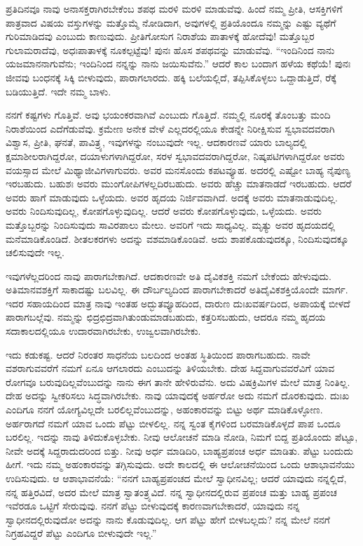 ಪ್ರತಿದಿನವೂ ನಾವು ಅನಾಸಕ್ತರಾಗಿರಬೇಕೆಂಬ ಶಪಥ ಮರಳಿ ಮರಳಿ ಮಾಡುವೆವು. ಹಿಂದೆ ನಮ್ಮ ಪ್ರೀತಿ, ಆಸಕ್ತಿಗಳಿಗೆ ಪಾತ್ರವಾದ ವಿಷಯ ವಸ್ತುಗಳನ್ನು ಮತ್ತೊಮ್ಮೆ ನೋಡಿದಾಗ, ಅವುಗಳಲ್ಲಿ ಪ್ರತಿಯೊಂದೂ ನಮ್ಮನ್ನು ಎಷ್ಟು ವ್ಯಥೆಗೆ ಗುರಿಮಾಡಿದವು ಎಂಬುದು ಕಾಣುವುದು. ಪ್ರೀತಿಗೋಸುಗ ನಿರಾಶೆಯ ಪಾತಾಳಕ್ಕೆ ಹೋದೆವು! ಮತ್ತೊಬ್ಬರ ಗುಲಾಮರಾದೆವು, ಅಧಃಪಾತಾಳಕ್ಕೆ ನೂಕಲ್ಪಟ್ಟೆವು! ಪುನಃ ಹೊಸ ಶಪಥವನ್ನು ಮಾಡುವೆವು. “ಇಂದಿನಿಂದ ನಾನು ಯಜಮಾನನಾಗುವೆನು; ಇಂದಿನಿಂದ ನನ್ನನ್ನು ನಾನು ಜಯಿಸುವೆನು.'' ಆದರೆ ಕಾಲ ಬಂದಾಗ ಹಳೆಯ ಕಥೆಯೆ! ಪುನಃ ಜೀವವು ಬಂಧನಕ್ಕೆ ಸಿಕ್ಕಿ ಬೀಳುವುದು, ಪಾರಾಗಲಾರದು. ಹಕ್ಕಿ ಬಲೆಯಲ್ಲಿದೆ, ತಪ್ಪಿಸಿಕೊಳ್ಳಲು ಒದ್ದಾಡುತ್ತಿದೆ, ರೆಕ್ಕೆ ಬಡಿಯುತ್ತಿದೆ. ಇದೇ ನಮ್ಮ ಬಾಳು.

ನನಗೆ ಕಷ್ಟಗಳು ಗೊತ್ತಿವೆ. ಅವು ಭಯಂಕರವಾಗಿವೆ ಎಂಬುದು ಗೊತ್ತಿದೆ. ನಮ್ಮಲ್ಲಿ ನೂರಕ್ಕೆ ತೊಂಬತ್ತು ಮಂದಿ ನಿರಾಶೆಯಿಂದ ಎದೆಗೆಡುವೆವು. ಕ್ರಮೇಣ ಅನೇಕ ವೇಳೆ ಎಲ್ಲದರಲ್ಲಿಯೂ ಕೇಡನ್ನೇ ನಿರೀಕ್ಷಿಸುವ ಸ್ವಭಾವದವರಾಗಿ ವಿಶ್ವಾಸ, ಪ್ರೀತಿ, ಘನತೆ, ಪಾವಿತ್ರ್ಯ, ಇವುಗಳನ್ನು ನಂಬುವುದೇ ಇಲ್ಲ. ಆದಕಾರಣವೆ ಯಾರು ಬಾಲ್ಯದಲ್ಲಿ ಕ್ಷಮಾಶೀಲರಾಗಿದ್ದರೋ, ದಯಾಳುಗಳಾಗಿದ್ದರೋ, ಸರಳ ಸ್ವಭಾವದವರಾಗಿದ್ದರೋ, ನಿಷ್ಕಪಟಿಗಳಾಗಿದ್ದರೋ ಅವರು ವಯಸ್ಸಾದ ಮೇಲೆ ಮಿಥ್ಯಾಜೀವಿಗಳಾಗುವರು. ಅವರ ಮನಸೊಂದು ಕಪಟವ್ಯೂಹ. ಅದರಲ್ಲಿ ಎಷ್ಟೋ ಬಾಹ್ಯ ನೈಪುಣ್ಯ ಇರಬಹುದು. ಬಹುಶಃ ಅವರು ಮುಂಗೋಪಿಗಳಲ್ಲದಿರಬಹುದು. ಅವರು ಹೆಚ್ಚು ಮಾತನಾಡದೆ ಇರಬಹುದು. ಆದರೆ ಅವರು ಹಾಗೆ ಮಾಡುವುದು ಒಳ್ಳೆಯದು. ಅವರ ಹೃದಯ ನಿರ್ಜಿವವಾಗಿದೆ. ಅದಕ್ಕೆ ಅವರು ಮಾತನಾಡುವುದಿಲ್ಲ. ಅವರು ನಿಂದಿಸುವುದಿಲ್ಲ, ಕೋಪಗೊಳ್ಳುವುದಿಲ್ಲ. ಆದರೆ ಅವರು ಕೋಪಗೊಳ್ಳುವುದು, ಒಳ್ಳೆಯದು. ಅವರು ಮತ್ತೊಬ್ಬರನ್ನು ನಿಂದಿಸುವುದು ಸಾವಿರಪಾಲು ಮೇಲು. ಅವರಿಗೆ ಇದು ಸಾಧ್ಯವಿಲ್ಲ. ಮೃತ್ಯು ಅವರ ಹೃದಯದಲ್ಲಿ ಮನೆಮಾಡಿಕೊಂಡಿದೆ. ಶೀತಲಕರಗಳು ಅದನ್ನು ವಶಮಾಡಿಕೊಂಡಿವೆ. ಅದು ಶಾಪಕೊಡುವುದಕ್ಕೂ, ನಿಂದಿಸುವುದಕ್ಕೂ ಚಲಿಸುವುದೇ ಇಲ್ಲ.

ಇವುಗಳೆಲ್ಲದರಿಂದ ನಾವು ಪಾರಾಗಬೇಕಾಗಿದೆ. ಆದಕಾರಣವೇ ಅತಿ ದೈವಿಕಶಕ್ತಿ ನಮಗೆ ಬೇಕೆಂದು ಹೇಳುವುದು. ಅತಿಮಾನವಶಕ್ತಿಗೆ ಸಾಕಾದಷ್ಟು ಬಲವಿಲ್ಲ. ಈ ದೌರ್ಬಲ್ಯದಿಂದ ಪಾರಾಗಬೇಕಾದರೆ ಅತಿದೈವಿಕಶಕ್ತಿಯೊಂದೇ ಮಾರ್ಗ. ಇದರ ಸಹಾಯದಿಂದ ಮಾತ್ರ ನಾವು ಇಂತಹ ಅದ್ಭುತವ್ಯೂಹದಿಂದ, ದಾರುಣ ದುಃಖವರ್ಷದಿಂದ, ಅಪಾಯಕ್ಕೆ ಬೀಳದೆ ಪಾರಾಗಬಲ್ಲೆವು. ನಮ್ಮನ್ನು ಛಿದ್ರಛಿದ್ರವಾಗಿ\break ತುಂಡುಮಾಡಬಹುದು, ಕತ್ತರಿಸಬಹುದು, ಆದರೂ ನಮ್ಮ ಹೃದಯ ಸದಾಕಾಲದಲ್ಲಿಯೂ ಉದಾರವಾಗಿರಬೇಕು, ಉಜ್ವಲವಾಗಿರಬೇಕು.

ಇದು ಕಡುಕಷ್ಟ. ಆದರೆ ನಿರಂತರ ಸಾಧನೆಯ ಬಲದಿಂದ ಅಂತಹ ಸ್ಥಿತಿಯಿಂದ ಪಾರಾಗಬಹುದು. ನಾವೇ ವಶರಾಗುವವರೆಗೆ ನಮಗೆ ಏನೂ ಆಗಲಾರದು ಎಂಬುದನ್ನು ತಿಳಿಯಬೇಕು. ದೇಹ ಸಿದ್ದವಾಗುವವರೆವಿಗೆ ಯಾವ ರೋಗವೂ ಬರುವುದಿಲ್ಲವೆಂಬುದನ್ನು ನಾನು ಈಗ ತಾನೇ ಹೇಳಿರುವೆನು. ಅದು ವಿಷಕ್ರಿಮಿಗಳ ಮೇಲೆ ಮಾತ್ರ ನಿಂತಿಲ್ಲ. ದೇಹ ಅದನ್ನು ಸ್ವೀಕರಿಸಲು ಸಿದ್ಧವಾಗಿರಬೇಕು. ನಾವು ಯಾವುದಕ್ಕೆ ಅರ್ಹರೋ ಅದು ನಮಗೆ ದೊರಕುವುದು. ದುಃಖ ಎಂದಿಗೂ ನನಗೆ ಯೋಗ್ಯವಿಲ್ಲದೇ ಬರಲಿಲ್ಲವೆಂಬುದನ್ನು, ಅಹಂಕಾರವನ್ನು ಬಿಟ್ಟು ಅರ್ಥ ಮಾಡಿಕೊಳ್ಳೋಣ. ಅರ್ಹರಾಗದೆ ನಮಗೆ ಯಾವ ಒಂದು ಪೆಟ್ಟು ಬೀಳಲಿಲ್ಲ. ನನ್ನ ಸ್ವಂತ ಕೈಗಳಿಂದ ಬರಮಾಡಿಕೊಳ್ಳದೆ ಪಾಪ ಒಂದೂ ಬರಲಿಲ್ಲ. ಇದನ್ನು ನಾವು ತಿಳಿದುಕೊಳ್ಳಬೇಕು. ನೀವು ಆಲೋಚನೆ ಮಾಡಿ ನೋಡಿ, ನಿಮಗೆ ಬಿದ್ದ ಪ್ರತಿಯೊಂದು ಪೆಟ್ಟೂ, ನೀವೇ ಅದಕ್ಕೆ ಸಿದ್ದರಾದುದರಿಂದ ಬಿತ್ತು. ನೀವು ಅರ್ಧ ಮಾಡಿದಿರಿ, ಬಾಹ್ಯಪ್ರಪಂಚ ಅರ್ಧ ಮಾಡಿತು. ಪೆಟ್ಟು ಬಂದುದು ಹೀಗೆ. ಇದು ನಮ್ಮ ಅಹಂಕಾರವನ್ನು ತಗ್ಗಿಸುವುದು. ಅದೇ ಕಾಲದಲ್ಲಿ ಈ ಆಲೋಚನೆಯಿಂದ ಒಂದು ಆಶಾಭಾವನೆಯು ಉದಿಸುವುದು. ಆ ಆಶಾಭಾವನೆಯೆ: “ನನಗೆ ಬಾಹ್ಯಪ್ರಪಂಚದ ಮೇಲೆ ಸ್ವಾಧೀನವಿಲ್ಲ; ಆದರೆ ಯಾವುದು ನನ್ನಲ್ಲಿದೆ, ನನ್ನ ಹತ್ತಿರವಿದೆ, ಅದರ ಮೇಲೆ ಮಾತ್ರ ಸ್ವಾತಂತ್ರ್ಯವಿದೆ. ನನ್ನ ಸ್ವಾಧೀನದಲ್ಲಿರುವ ಪ್ರಪಂಚ ಮತ್ತು ಬಾಹ್ಯ ಪ್ರಪಂಚ ಇವೆರಡೂ ಒಟ್ಟಿಗೆ ಸೇರುವುವು. ನನಗೆ ಪೆಟ್ಟು ಬೀಳುವುದಕ್ಕೆ ಕಾರಣವಾಗಬೇಕಾದರೆ, ಯಾವುದು ನನ್ನ ಸ್ವಾಧೀನದಲ್ಲಿರುವುದೋ ಅದನ್ನು ನಾನು ಕೊಡುವುದಿಲ್ಲ. ಆಗ ಪೆಟ್ಟು ಹೇಗೆ ಬೀಳಬಲ್ಲದು? ನನ್ನ ಮೇಲೆ ನನಗೆ ನಿಗ್ರಹವಿದ್ದರೆ ಪೆಟ್ಟು ಎಂದಿಗೂ ಬೀಳುವುದೇ ಇಲ್ಲ.”

